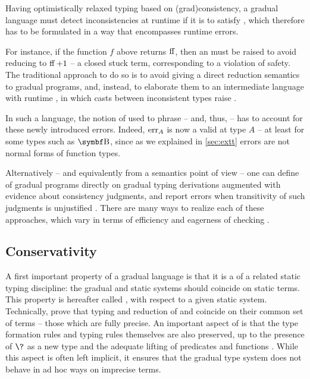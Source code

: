 Having optimistically relaxed typing based on \kl(grad){consistency},
a gradual language must detect inconsistencies at runtime if it is to satisfy ,
which therefore has to be formulated in a way that encompasses runtime errors.

For instance, if the function $f$ above returns $\operatorname{ff}$,
then an  must be raised to avoid reducing to $\operatorname{ff} + 1$ – a closed stuck term,
corresponding to a violation of safety.
The traditional approach to do so is to avoid giving a direct reduction semantics to gradual
programs, and, instead, to elaborate them to an intermediate language with runtime ,
in which casts between inconsistent types raise %
.

In such a language, the notion of  used to phrase  – and,
thus,  – has to account for these newly introduced errors. Indeed, $\err[A]$
is now a valid  at type $A$ – at least for some types such as $\Bool$,
since as we explained in \cref{sec:extt}  errors are not normal forms of
function types.

Alternatively – and equivalently from a semantics point of view – one can define 
of gradual programs directly on gradual typing derivations augmented with evidence about
consistency judgments, and report errors when transitivity of such judgments is
unjustified .
There are many ways to realize each of these approaches,
which vary in terms of efficiency and eagerness of checking .

\subsection{Conservativity} A first important property of a gradual language is that it is a
 of a related static typing discipline:
the gradual and static systems should coincide on static terms.
This property is hereafter called ,
with respect to a given static system.
Technically,  prove that typing and reduction of  and
 coincide on their common set of terms – \ie those which are fully precise.
An important aspect of  is that the type formation rules and typing
rules themselves are also preserved, up to the presence of $\?$ as a new type and the
adequate lifting of predicates and functions .
While this aspect is often left implicit, it ensures that the gradual type system does not
behave in ad hoc ways on imprecise terms.

